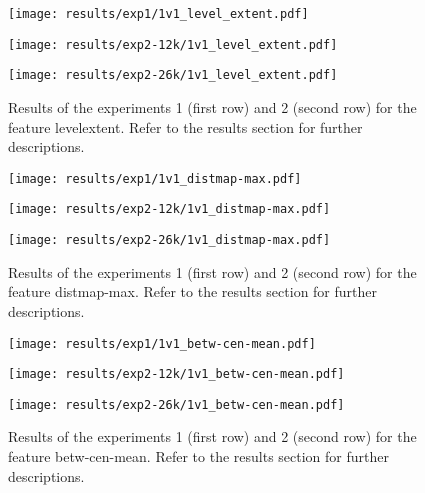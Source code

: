 \begin{figure}[h!]
	\centering
	\begin{minipage}{0.4\linewidth}
		\texttt{[image: results/exp1/1v1\_level\_extent.pdf]}
	\end{minipage}
	
	\begin{minipage}{0.4\linewidth}
		\texttt{[image: results/exp2-12k/1v1\_level\_extent.pdf]}
	\end{minipage}
	\begin{minipage}{0.4\linewidth}
		\texttt{[image: results/exp2-26k/1v1\_level\_extent.pdf]}
	\end{minipage}
	
	\caption[ Results: Feature level\textunderscore extent]{ Results of the experiments 1 (first row) and 2 (second row) for the feature level\textunderscore extent. Refer to the results section for further descriptions. }
	\label{fig:appendix_level_extent}
\end{figure}

\begin{figure}[h!]
	\centering
	\begin{minipage}{0.4\linewidth}
		\texttt{[image: results/exp1/1v1\_distmap-max.pdf]}
	\end{minipage}
	
	\begin{minipage}{0.4\linewidth}
		\texttt{[image: results/exp2-12k/1v1\_distmap-max.pdf]}
	\end{minipage}
	\begin{minipage}{0.4\linewidth}
		\texttt{[image: results/exp2-26k/1v1\_distmap-max.pdf]}
	\end{minipage}
	
	\caption[ Results: Feature distmap-max]{ Results of the experiments 1 (first row) and 2 (second row) for the feature distmap-max. Refer to the results section for further descriptions. }
	\label{fig:appendix_distmap-max}
\end{figure}
\newpage 


\begin{figure}[h!]
	\centering
	\begin{minipage}{0.4\linewidth}
		\texttt{[image: results/exp1/1v1\_betw-cen-mean.pdf]}
	\end{minipage}
	
	\begin{minipage}{0.4\linewidth}
		\texttt{[image: results/exp2-12k/1v1\_betw-cen-mean.pdf]}
	\end{minipage}
	\begin{minipage}{0.4\linewidth}
		\texttt{[image: results/exp2-26k/1v1\_betw-cen-mean.pdf]}
	\end{minipage}
	
	\caption[ Results: Feature betw-cen-mean]{ Results of the experiments 1 (first row) and 2 (second row) for the feature betw-cen-mean. Refer to the results section for further descriptions. }
	\label{fig:appendix_betw-cen-mean}
\end{figure}

